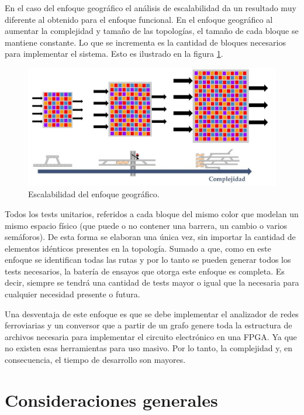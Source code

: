 			En el caso del enfoque geográfico el análisis de escalabilidad da un resultado muy diferente al obtenido para el enfoque funcional. En el enfoque geográfico al aumentar la complejidad y tamaño de las topologías, el tamaño de cada bloque se mantiene constante.  Lo que se incrementa es la cantidad de bloques necesarios para implementar el sistema. Esto es ilustrado en la figura \ref{fig:Escala_Geografico}.
					
			\begin{figure}[h]
			\centering
				\includegraphics[scale=.5]{./Figures/Geografico_complejidad}
				\caption{Escalabilidad del enfoque geográfico.}
				\label{fig:Escala_Geografico}
			\end{figure}
		
			
			Todos los tests unitarios, referidos a cada bloque del mismo color que modelan un mismo espacio físico (que puede o no contener una barrera, un cambio o varios semáforos). De esta forma se elaboran una única vez, sin importar la cantidad de elementos idénticos presentes en la topología. Sumado a que, como en este enfoque se identifican todas las rutas y por lo tanto se pueden generar todos los tests necesarios, la batería de ensayos que otorga este enfoque es completa. Es decir, siempre se tendrá una cantidad de tests mayor o igual que la necesaria para cualquier necesidad presente o futura.
		
			Una desventaja de este enfoque es que se debe implementar el analizador de redes ferroviarias y un conversor que a partir de un grafo genere toda la estructura de archivos necesaria para implementar el circuito electrónico en una FPGA. Ya que no existen esas herramientas para uso masivo. Por lo tanto, la complejidad y, en consecuencia, el tiempo de desarrollo son mayores.
			
\section{Consideraciones generales}

